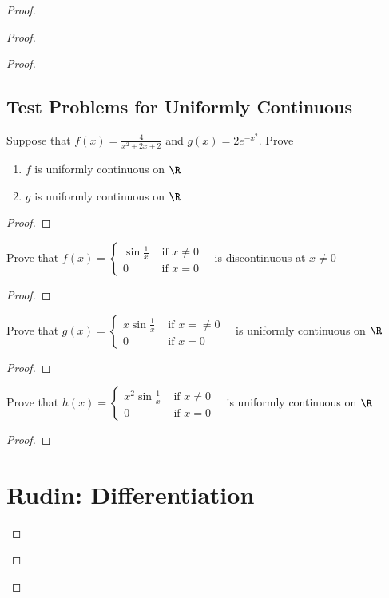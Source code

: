 \documentclass{report}
\begin{document}
\begin{proof}
\begin{proof}
\begin{proof}
\section{Test Problems for Uniformly Continuous}
\begin{question}{}{}
Suppose that $f(x)=\frac{4}{x^2+2x+2}$ and $g(x)=2e^{-x^2}$. Prove 
\begin{enumerate}[label=(\alph*)]
  \item $f$ is uniformly continuous on  $\R$ 
   \item $g$ is uniformly continuous on  $\R$
\end{enumerate}
\end{question}
\begin{proof}

\end{proof}
\begin{question}{}{}
Prove that $f(x)=\begin{cases} \sin \frac{1}{x} & \text{ if $x\neq 0$ }\\
  0& \text{ if $x=0$ }
\end{cases}$ is discontinuous at $x\neq 0$
\end{question}
\begin{proof}

\end{proof}
\begin{question}{}{}
Prove that $g(x)=\begin{cases}
  x \sin \frac{1}{x}& \text{ if $x=\neq 0$ }\\
  0& \text{ if $x=0$ }
\end{cases}$ is uniformly continuous on $\R$
\end{question}
\begin{proof}

\end{proof}
\begin{question}{}{}
Prove that $h(x)=\begin{cases}
  x^2 \sin \frac{1}{x} & \text{ if $x\neq 0$ }\\
  0& \text{ if $x=0$ }
\end{cases}$ is uniformly continuous on $\R$
\end{question}
\begin{proof}

\end{proof}
\chapter{Rudin: Differentiation}

\end{proof}
\end{proof}
\end{proof}
\end{document}
